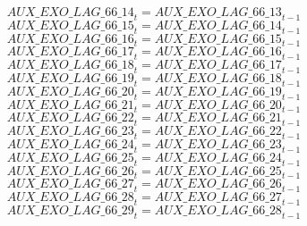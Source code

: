 \begin{dmath}
{AUX\_EXO\_LAG\_66\_14}_{t}={AUX\_EXO\_LAG\_66\_13}_{t-1}
\end{dmath}
\begin{dmath}
{AUX\_EXO\_LAG\_66\_15}_{t}={AUX\_EXO\_LAG\_66\_14}_{t-1}
\end{dmath}
\begin{dmath}
{AUX\_EXO\_LAG\_66\_16}_{t}={AUX\_EXO\_LAG\_66\_15}_{t-1}
\end{dmath}
\begin{dmath}
{AUX\_EXO\_LAG\_66\_17}_{t}={AUX\_EXO\_LAG\_66\_16}_{t-1}
\end{dmath}
\begin{dmath}
{AUX\_EXO\_LAG\_66\_18}_{t}={AUX\_EXO\_LAG\_66\_17}_{t-1}
\end{dmath}
\begin{dmath}
{AUX\_EXO\_LAG\_66\_19}_{t}={AUX\_EXO\_LAG\_66\_18}_{t-1}
\end{dmath}
\begin{dmath}
{AUX\_EXO\_LAG\_66\_20}_{t}={AUX\_EXO\_LAG\_66\_19}_{t-1}
\end{dmath}
\begin{dmath}
{AUX\_EXO\_LAG\_66\_21}_{t}={AUX\_EXO\_LAG\_66\_20}_{t-1}
\end{dmath}
\begin{dmath}
{AUX\_EXO\_LAG\_66\_22}_{t}={AUX\_EXO\_LAG\_66\_21}_{t-1}
\end{dmath}
\begin{dmath}
{AUX\_EXO\_LAG\_66\_23}_{t}={AUX\_EXO\_LAG\_66\_22}_{t-1}
\end{dmath}
\begin{dmath}
{AUX\_EXO\_LAG\_66\_24}_{t}={AUX\_EXO\_LAG\_66\_23}_{t-1}
\end{dmath}
\begin{dmath}
{AUX\_EXO\_LAG\_66\_25}_{t}={AUX\_EXO\_LAG\_66\_24}_{t-1}
\end{dmath}
\begin{dmath}
{AUX\_EXO\_LAG\_66\_26}_{t}={AUX\_EXO\_LAG\_66\_25}_{t-1}
\end{dmath}
\begin{dmath}
{AUX\_EXO\_LAG\_66\_27}_{t}={AUX\_EXO\_LAG\_66\_26}_{t-1}
\end{dmath}
\begin{dmath}
{AUX\_EXO\_LAG\_66\_28}_{t}={AUX\_EXO\_LAG\_66\_27}_{t-1}
\end{dmath}
\begin{dmath}
{AUX\_EXO\_LAG\_66\_29}_{t}={AUX\_EXO\_LAG\_66\_28}_{t-1}
\end{dmath}
